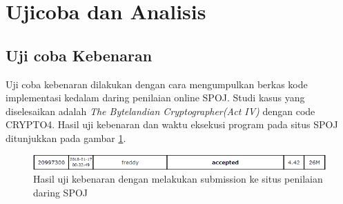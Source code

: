 \section{Ujicoba dan Analisis}

\subsection{Uji coba Kebenaran}
Uji coba kebenaran dilakukan dengan cara mengumpulkan berkas kode implementasi kedalam daring penilaian online SPOJ. Studi kasus yang diselesaikan adalah \textit{The Bytelandian Cryptographer(Act IV)} dengan code CRYPTO4. Hasil uji kebenaran dan waktu eksekusi program pada situs SPOJ ditunjukkan pada gambar \ref{fig:best}.
\begin{figure}[H]
\centering
\includegraphics[scale=0.3]{images/best.png}
\caption{Hasil uji kebenaran dengan melakukan submission ke situs penilaian daring SPOJ}
\label{fig:best}
\end{figure}

